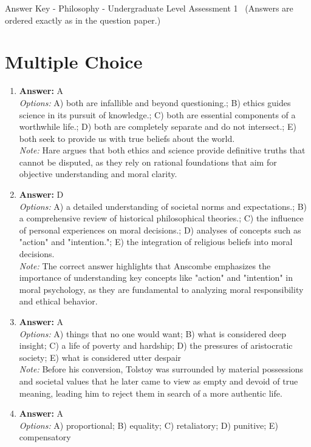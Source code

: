 \documentclass[12pt]{article}
\begin{document}
\begin{center}
Answer Key - Philosophy - Undergraduate Level Assessment 1 \
\small (Answers are ordered exactly as in the question paper.)
\end{center}

\section*{Multiple Choice}
\begin{enumerate}[label=\arabic*.]
\item \textbf{Answer:} A
\\ \textit{Options:} A) both are infallible and beyond questioning.; B) ethics guides science in its pursuit of knowledge.; C) both are essential components of a worthwhile life.; D) both are completely separate and do not intersect.; E) both seek to provide us with true beliefs about the world.
\\ \textit{Note:} Hare argues that both ethics and science provide definitive truths that cannot be disputed, as they rely on rational foundations that aim for objective understanding and moral clarity.
\item \textbf{Answer:} D
\\ \textit{Options:} A) a detailed understanding of societal norms and expectations.; B) a comprehensive review of historical philosophical theories.; C) the influence of personal experiences on moral decisions.; D) analyses of concepts such as "action" and "intention."; E) the integration of religious beliefs into moral decisions.
\\ \textit{Note:} The correct answer highlights that Anscombe emphasizes the importance of understanding key concepts like "action" and "intention" in moral psychology, as they are fundamental to analyzing moral responsibility and ethical behavior.
\item \textbf{Answer:} A
\\ \textit{Options:} A) things that no one would want; B) what is considered deep insight; C) a life of poverty and hardship; D) the pressures of aristocratic society; E) what is considered utter despair
\\ \textit{Note:} Before his conversion, Tolstoy was surrounded by material possessions and societal values that he later came to view as empty and devoid of true meaning, leading him to reject them in search of a more authentic life.
\item \textbf{Answer:} A
\\ \textit{Options:} A) proportional; B) equality; C) retaliatory; D) punitive; E) compensatory

\end{enumerate}
\end{document}
